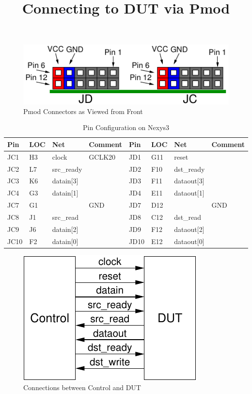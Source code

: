 \documentclass{article}
\begin{document}
\title{Connecting to DUT via Pmod}

\maketitle

\begin{figure}[ht]
  \begin{center}
    \includegraphics[scale=1]{figures/pmod_connector}
    \caption{Pmod Connectors as Viewed from Front}
  \end{center}
\end{figure}

\begin{table}[ht]
  \begin{center}
    \caption{Pin Configuration on Nexys3}
    \begin{tabular}{llll|llll}
      Pin  & LOC & Net         & Comment & Pin  & LOC & Net        & Comment \\ \hline
       JC1 & H3  & clock       & GCLK20  &  JD1 & G11 & reset      & \\
       JC2 & L7  & src\_ready  &         &  JD2 & F10 & dst\_ready & \\
       JC3 & K6  & datain[3]   &         &  JD3 & F11 & dataout[3] & \\
       JC4 & G3  & datain[1]   &         &  JD4 & E11 & dataout[1] & \\
       JC7 & G1  &             & GND     &  JD7 & D12 &            & GND \\
       JC8 & J1  & src\_read   &         &  JD8 & C12 & dst\_read  & \\
       JC9 & J6  & datain[2]   &         &  JD9 & F12 & dataout[2] & \\
      JC10 & F2  & datain[0]   &         & JD10 & E12 & dataout[0] & \\
    \end{tabular}
  \end{center}
\end{table}

\begin{figure}[ht]
  \begin{center}
    \includegraphics[scale=1]{figures/ctrl-dut_connections}
    \caption{Connections between Control and DUT}
  \end{center}
\end{figure}
\end{document}
